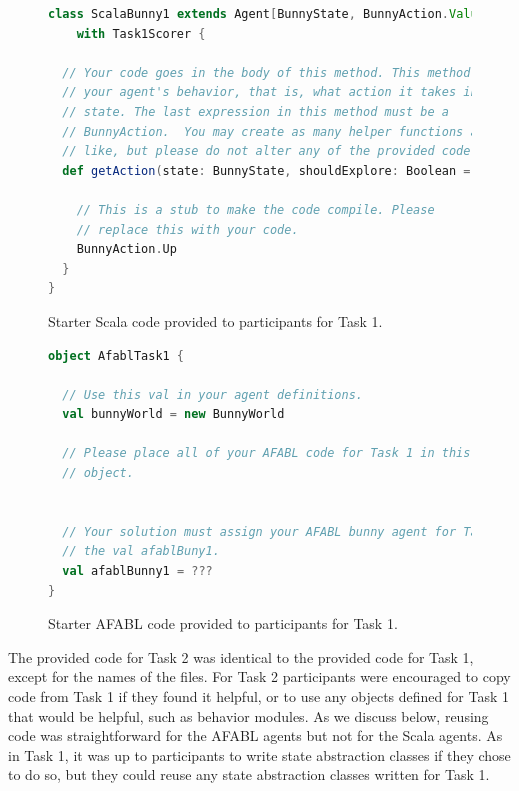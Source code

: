 \begin{figure}[!h]
\begin{center}

\begin{lstlisting}[language=Scala]
class ScalaBunny1 extends Agent[BunnyState, BunnyAction.Value]
    with Task1Scorer {

  // Your code goes in the body of this method. This method defines
  // your agent's behavior, that is, what action it takes in a given
  // state. The last expression in this method must be a
  // BunnyAction.  You may create as many helper functions as you
  // like, but please do not alter any of the provided code.
  def getAction(state: BunnyState, shouldExplore: Boolean = false) = {

    // This is a stub to make the code compile. Please
    // replace this with your code.
    BunnyAction.Up
  }
}
\end{lstlisting}

\caption{Starter Scala code provided to participants for Task 1.}
\end{center}
\label{fig:scala-task1-provided}
\end{figure}


\begin{figure}[!h]
\begin{center}

\begin{lstlisting}[language=Scala]
object AfablTask1 {

  // Use this val in your agent definitions.
  val bunnyWorld = new BunnyWorld

  // Please place all of your AFABL code for Task 1 in this singleton
  // object.


  // Your solution must assign your AFABL bunny agent for Task 1 to
  // the val afablBuny1.
  val afablBunny1 = ???
}
\end{lstlisting}

\caption{Starter AFABL code provided to participants for Task 1.}
\end{center}
\label{fig:afabl-task1-provided}
\end{figure}


The provided code for Task 2 was identical to the provided code for Task 1, except for the names of the files. For Task 2 participants were encouraged to copy code from Task 1 if they found it helpful, or to use any objects defined for Task 1 that would be helpful, such as behavior modules. As we discuss below, reusing code was straightforward for the AFABL agents but not for the Scala agents. As in Task 1, it was up to participants to write state abstraction classes if they chose to do so, but they could reuse any state abstraction classes written for Task 1.

